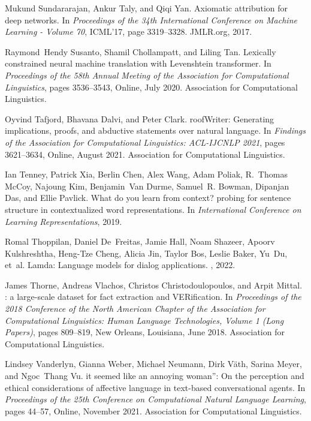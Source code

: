 \documentclass[11pt]{article}
\begin{document}
\begin{thebibliography}{100}
Mukund Sundararajan, Ankur Taly, and Qiqi Yan.
\newblock Axiomatic attribution for deep networks.
\newblock In {\em Proceedings of the 34th International Conference on Machine
  Learning - Volume 70}, ICML'17, page 3319–3328. JMLR.org, 2017.

Raymond~Hendy Susanto, Shamil Chollampatt, and Liling Tan.
\newblock Lexically constrained neural machine translation with {L}evenshtein
  transformer.
\newblock In {\em Proceedings of the 58th Annual Meeting of the Association for
  Computational Linguistics}, pages 3536--3543, Online, July 2020. Association
  for Computational Linguistics.

Oyvind Tafjord, Bhavana Dalvi, and Peter Clark.
roof{W}riter: Generating implications, proofs, and abductive
  statements over natural language.
\newblock In {\em Findings of the Association for Computational Linguistics:
  ACL-IJCNLP 2021}, pages 3621--3634, Online, August 2021. Association for
  Computational Linguistics.

Ian Tenney, Patrick Xia, Berlin Chen, Alex Wang, Adam Poliak, R.~Thomas McCoy,
  Najoung Kim, Benjamin~Van Durme, Samuel~R. Bowman, Dipanjan Das, and Ellie
  Pavlick.
\newblock What do you learn from context? probing for sentence structure in
  contextualized word representations.
\newblock In {\em International Conference on Learning Representations}, 2019.

Romal Thoppilan, Daniel De~Freitas, Jamie Hall, Noam Shazeer, Apoorv
  Kulshreshtha, Heng-Tze Cheng, Alicia Jin, Taylor Bos, Leslie Baker, Yu~Du,
  et~al.
\newblock Lamda: Language models for dialog applications.
, 2022.

James Thorne, Andreas Vlachos, Christos Christodoulopoulos, and Arpit Mittal.
: a large-scale dataset for fact extraction and
  {VER}ification.
\newblock In {\em Proceedings of the 2018 Conference of the North {A}merican
  Chapter of the Association for Computational Linguistics: Human Language
  Technologies, Volume 1 (Long Papers)}, pages 809--819, New Orleans,
  Louisiana, June 2018. Association for Computational Linguistics.

Lindsey Vanderlyn, Gianna Weber, Michael Neumann, Dirk V{\"a}th, Sarina Meyer,
  and Ngoc~Thang Vu.
it seemed like an annoying woman{''}: On the perception and
  ethical considerations of affective language in text-based conversational
  agents.
\newblock In {\em Proceedings of the 25th Conference on Computational Natural
  Language Learning}, pages 44--57, Online, November 2021. Association for
  Computational Linguistics.


\end{thebibliography}
\end{document}
